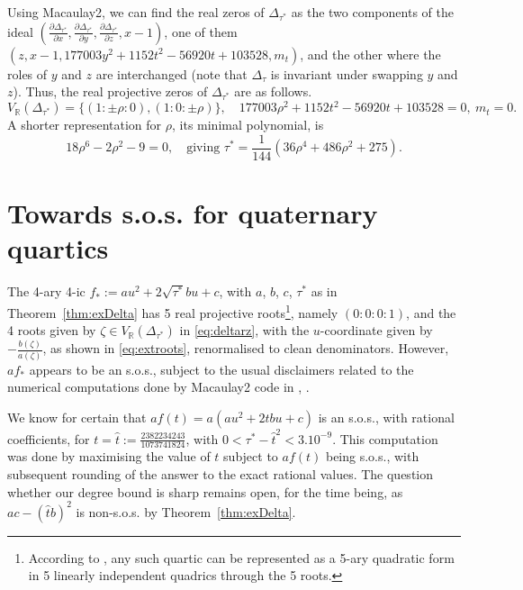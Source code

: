 \documentclass[a4paper,twoside,reqno]{amsart}
\newcommand{\RR}{\mathbb{R}}
\theoremstyle{plain}
\theoremstyle{definition}
\theoremstyle{remark}
\begin{document}
Using Macaulay2, we can find the real zeros of $\Delta_{\tau^*}$ as
the two components of the ideal $(\frac{\partial \Delta_{\tau^*}}{\partial x}, \frac{\partial \Delta_{\tau^*}}{\partial y}, \frac{\partial \Delta_{\tau^*}}{\partial z}, x-1)$, one of them
$(z,x-1,177003y^2+1152t^2-56920t+103528,m_t)$, and the other where
the roles of $y$ and $z$ are interchanged (note that $\Delta_{\tau}$ is invariant under swapping $y$ and $z$). Thus, the real projective zeros of $\Delta_{\tau^*}$ are as follows.
\begin{equation}\label{eq:deltarz}
  V_{\RR}(\Delta_{\tau^*})=\{(1:\pm\rho:0), (1:0:\pm\rho)\}, \quad 177003\rho^2+1152t^2-56920t+103528=0,\ m_t=0.
\end{equation}
A shorter representation for $\rho$, its minimal polynomial, is
\begin{equation} \label{eq:rhomin}
  18\rho^6-2\rho^2-9=0,\quad\text{giving } \tau^*=\frac{1}{144}(36\rho^4+486\rho^2+275).
\end{equation}

\section{Towards s.o.s. for quaternary quartics}\label{subsect:remarks}
The 4-ary 4-ic $f_*:=au^2+2\sqrt{\tau^*}bu+c$, with $a$, $b$, $c$, $\tau^*$ as in Theorem~\ref{thm:exDelta}
has 5 real projective roots\footnote{
According to \cite[Chapter~I.2]{zbMATH06551558}, any such quartic can be represented as a 5-ary quadratic form in 5 linearly independent quadrics through the 5 roots.}, namely $(0{:}0{:}0{:}1)$, and the 4 roots given by $\zeta\in V_{\RR}(\Delta_{\tau^*})$ in \eqref{eq:deltarz}, with the $u$-coordinate given by $-\frac{b(\zeta)}{a(\zeta)}$, as shown in \eqref{eq:extroots}, renormalised to
clean denominators.
However, $af_*$ appears to be an s.o.s., subject to the usual disclaimers related to the numerical computations done by Macaulay2 code in , .

We know for certain that $af(t)=a(au^2+2tbu+c)$ is an s.o.s., with rational coefficients,
for $t=\hat{t}:=\frac{2382234243}{1073741824}$, with $0<\tau^*-\hat{t}^2<3.10^{-9}$. This computation was done by maximising the value of $t$ subject to $af(t)$ being s.o.s., with subsequent rounding
of the answer to the exact rational values.
The question whether our degree bound is sharp remains open, for the time being,
as $ac-(\hat{t}b)^2$ is non-s.o.s. by Theorem~\ref{thm:exDelta}.
\end{document}
